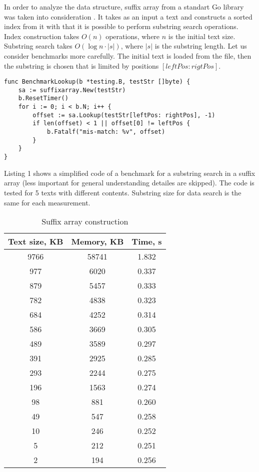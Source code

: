 
In order to analyze the data structure, suffix array from a standart Go library
was taken into consideration \cite{golang2016sa}. It takes as an input
a text and constructs a sorted index from it with that it is possible to perform
substring search operations. Index construction takes $O(n)$ operations, where $n$ is
the initial text size. Substring search takes $O(\log n \cdot |s|)$, where $|s|$ is the substring length.
Let us consider benchmarks more carefully. The initial text is loaded from the file,
then the substring is chosen that is limited by positions $[leftPos:rigtPos]$.

\begin{lstlisting}[caption=Suffix array example]
func BenchmarkLookup(b *testing.B, testStr []byte) {
    sa := suffixarray.New(testStr)
    b.ResetTimer()
    for i := 0; i < b.N; i++ {
        offset := sa.Lookup(testStr[leftPos: rightPos], -1)
        if len(offset) < 1 || offset[0] != leftPos {
            b.Fatalf("mis-match: %v", offset)
        }
    }
}
\end{lstlisting}

Listing 1 shows a simplified code of a benchmark for a substring search in a suffix array
(less important for general understanding detailes are skipped). The code is tested for 5 texts with
different contents. Substring size for data search is the same for each measurement.

\begin{table}[ht!]
    \centering
    \begin{tabular}{|c|c|c|}
        \hline
        Text size, KB & Memory, KB & Time, s\\
        \hline
        9766 & 58741 & 1.832\\
        \hline
        977 & 6020 & 0.337\\
        \hline
        879 & 5457 & 0.333\\
        \hline
        782 & 4838 & 0.323\\
        \hline
        684 & 4252 & 0.314\\
        \hline
        586 & 3669 & 0.305\\
        \hline
        489 & 3589 & 0.297\\
        \hline
        391 & 2925 & 0.285\\
        \hline
        293 & 2244 & 0.275\\
        \hline
        196 & 1563 & 0.274\\
        \hline
        98 & 881 & 0.260\\
        \hline
        49 & 547 & 0.258\\
        \hline
        10 & 246 & 0.252\\
        \hline
        5 & 212 & 0.251\\
        \hline
        2 & 194 & 0.256\\
        \hline
    \end{tabular}
    \caption{Suffix array construction}
    \label{table:2}
\end{table}

